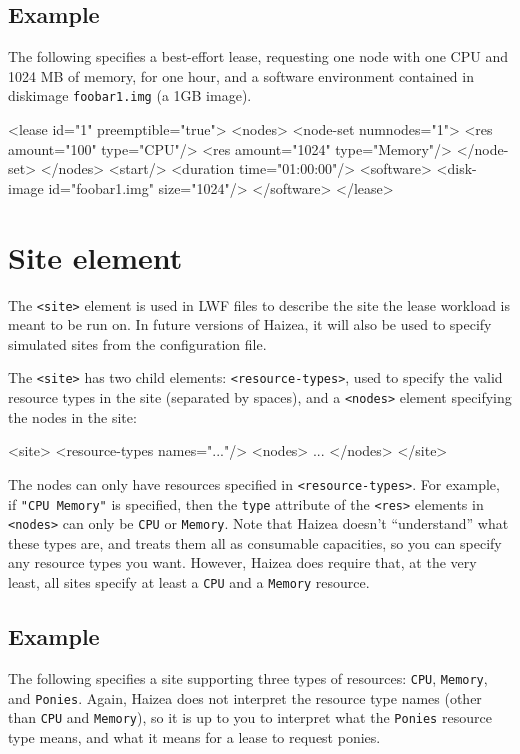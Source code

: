 \subsection{Example}

The following specifies a best-effort lease, requesting one node with one CPU and 1024 MB of memory, for one hour, and a software environment contained in diskimage \texttt{foobar1.img} (a 1GB image).

\begin{wideshellverbatim} 
<lease id="1" preemptible="true">
  <nodes>
    <node-set numnodes="1">
      <res amount="100" type="CPU"/>
      <res amount="1024" type="Memory"/>
    </node-set>
  </nodes>
  <start/>
  <duration time="01:00:00"/>
  <software>
    <disk-image id="foobar1.img" size="1024"/>
  </software>
</lease>
\end{wideshellverbatim}

\section{Site element}

The \texttt{<site>} element is used in LWF files to describe the site the lease workload is meant to be run on. In future versions of Haizea, it will also be used to specify simulated sites from the configuration file.

The \texttt{<site>} has two child elements: \texttt{<resource-types>}, used to specify the valid resource types in the site (separated by spaces), and a \texttt{<nodes>} element specifying the nodes in the site:

\begin{wideshellverbatim} 
<site>
  <resource-types names="..."/>
  <nodes>
    ...
  </nodes>
</site>
\end{wideshellverbatim} 

The nodes can only have resources specified in \texttt{<resource-types>}. For example, if \texttt{"CPU Memory"} is specified, then the \texttt{type} attribute of the \texttt{<res>} elements in \texttt{<nodes>} can only be \texttt{CPU} or \texttt{Memory}. Note that Haizea doesn't ``understand'' what these types are, and treats them all as consumable capacities, so you can specify any resource types you want. However, Haizea does require that, at the very least, all sites specify at least a \texttt{CPU} and a \texttt{Memory} resource.

\subsection{Example}
The following specifies a site supporting three types of resources: \texttt{CPU}, \texttt{Memory}, and \texttt{Ponies}. Again, Haizea does not interpret the resource type names (other than \texttt{CPU} and \texttt{Memory}), so it is up to you to interpret what the \texttt{Ponies} resource type means, and what it means for a lease to request ponies. 

